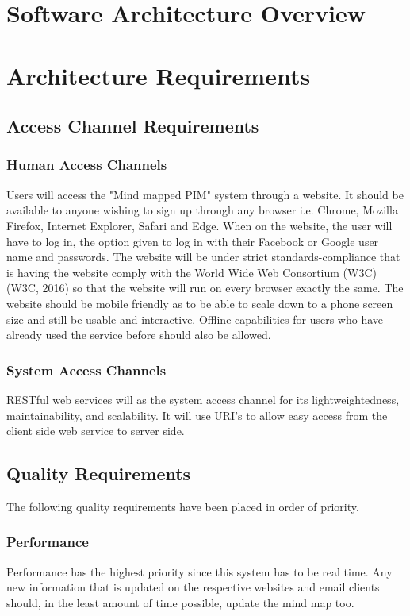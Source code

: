 \documentclass[hidelinks,english]{article}
\begin{document}
	
	\section{Software Architecture Overview}
	
	
	\section{Architecture Requirements}
		
		\subsection{Access Channel Requirements}
    		\subsubsection{Human Access Channels}
                Users  will access the "Mind mapped PIM" system through a website. It should be available to anyone wishing to sign up  through any browser i.e. Chrome, Mozilla Firefox, Internet Explorer, Safari and Edge. When on the website, the user will have to log in, the option given to log in with their Facebook or Google user name and passwords.  The website will be under strict standards-compliance that is having the website comply with the World Wide Web Consortium (W3C) (W3C, 2016)  so that the website will run on every browser exactly the same. The website should be mobile friendly as to be able to scale down to a phone screen size and still be usable and interactive. Offline capabilities for users who have already used the service before should also be allowed.
            \subsubsection{System Access Channels}
                RESTful web services will as the system access channel for its lightweightedness, maintainability, and scalability. It will use URI's to allow easy access from the client side web service to server side. 
		
		\subsection{Quality Requirements}
            The following quality requirements have been placed in order of priority.
            \subsubsection{Performance}
                Performance has the highest priority since this system has to be real time. Any new information that is updated on the respective websites and email clients should, in the least amount of time possible, update the mind map too. \\
                
\end{document}
